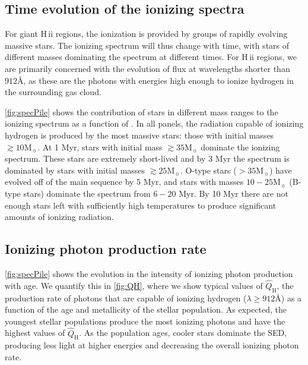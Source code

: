 \documentclass[linenumbers, trackchanges, tighten]{aastex61}%
\newcommand{\Fig}[1]{\autoref{fig:#1}}
\newcommand\Msun{\ensuremath{\mathrm{M_{\sun}}}}
\newcommand{\hii}{H\,{\sc ii}\xspace}
\newcommand\lam[1]{\ensuremath{\lambda #1}}
\newcommand{\ang}{\ensuremath{\mbox{\AA}}}
\newcommand{\QHat}{\ensuremath{\hat{Q}_{\mathrm{H}}}}
\begin{document}

\subsection{Time evolution of the ionizing spectra}\label{sec:spectra:age}

For giant \hii regions, the ionization is provided by groups of rapidly evolving massive stars. The ionizing spectrum will thus change with time, with stars of different masses dominating the spectrum at different times. For \hii regions, we are primarily concerned with the evolution of flux at wavelengths shorter than $912 \ang$, as these are the photons with energies high enough to ionize hydrogen in the surrounding gas cloud. 

\Fig{specPile} shows the  contribution of stars in different mass ranges to the ionizing spectrum  as a function of . In all panels, the radiation capable of ionizing hydrogen is produced by the most massive stars: those with initial masses $\gtrsim 10 \Msun$. At 1 Myr, stars with initial mass $\gtrsim35\Msun$ dominate the ionizing spectrum. These stars are extremely short-lived and by 3 Myr the spectrum is dominated by stars with initial masses $\gtrsim25\Msun$. O-type stars ($>35\Msun$) have evolved off of the main sequence by 5 Myr, and stars with masses $10-25\Msun$ (B-type stars) dominate the spectrum from $6-20$ Myr. By 10 Myr there are not enough stars left with sufficiently high temperatures to produce significant amounts of ionizing radiation.

\subsection{Ionizing photon production rate}\label{sec:spectra:Q}

\Fig{specPile} shows the evolution in the intensity of ionizing photon production with age. We quantify this in \Fig{QH}, where we show typical values of \QHat{}, the production rate of photons that are capable of ionizing hydrogen ($\lam \geq 912 \ang$) as a function of the age and metallicity of the stellar population. As expected, the youngest stellar populations produce the most ionizing photons and have the highest values of \QHat{}. As the population ages, cooler stars dominate the SED, producing less light at higher energies and decreasing the overall ionizing photon rate.
\end{document}
